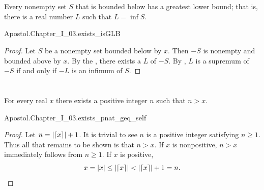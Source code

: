 \documentclass{report}
\begin{document}
\section{}

  \begin{theorem}[I.27]
    Every nonempty set $S$ that is bounded below has a greatest lower bound;
      that is, there is a real number $L$ such that $L = \inf{S}$.
  \end{theorem}

    {Apostol.Chapter\_I\_03.exists\_isGLB}

  \begin{proof}
    Let $S$ be a nonempty set bounded below by $x$.
    Then $-S$ is nonempty and bounded above by $x$.
    By the , there exists a
       $L$ of $-S$.
    By , $L$ is a supremum of $-S$ if and only if $-L$ is
      an infimum of $S$.
  \end{proof}

\section{}%

  \begin{theorem}[I.29]
    For every real $x$ there exists a positive integer $n$ such that $n > x$.
  \end{theorem}

    {Apostol.Chapter\_I\_03.exists\_pnat\_geq\_self}

  \begin{proof}
    Let $n = \left|\left\lceil x\right\rceil\right| + 1$.
    It is trivial to see $n$ is a positive integer satisfying $n \geq 1$.
    Thus all that remains to be shown is that $n > x$.
    If $x$ is nonpositive, $n > x$ immediately follows from $n \geq 1$.
    If $x$ is positive,
      $$x = \left|x\right| \leq \left|\left\lceil x\right\rceil\right| < \left|\left\lceil x\right\rceil\right| + 1 = n.$$
  \end{proof}

\section{}%
\end{document}
